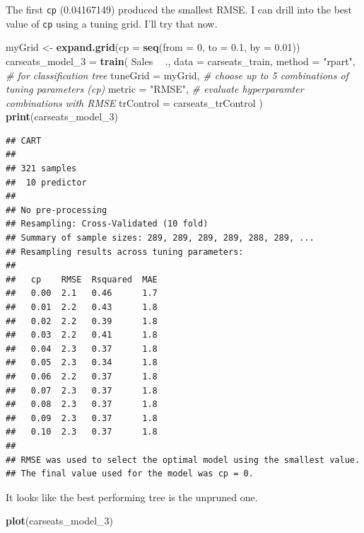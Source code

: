 \documentclass[
]{book}
\newenvironment{Shaded}{\begin{snugshade}}{\end{snugshade}}
\newcommand{\CommentTok}[1]{\textcolor[rgb]{0.56,0.35,0.01}{\textit{#1}}}
\newcommand{\DataTypeTok}[1]{\textcolor[rgb]{0.13,0.29,0.53}{#1}}
\newcommand{\DecValTok}[1]{\textcolor[rgb]{0.00,0.00,0.81}{#1}}
\newcommand{\FloatTok}[1]{\textcolor[rgb]{0.00,0.00,0.81}{#1}}
\newcommand{\KeywordTok}[1]{\textcolor[rgb]{0.13,0.29,0.53}{\textbf{#1}}}
\newcommand{\NormalTok}[1]{#1}
\newcommand{\OperatorTok}[1]{\textcolor[rgb]{0.81,0.36,0.00}{\textbf{#1}}}
\newcommand{\StringTok}[1]{\textcolor[rgb]{0.31,0.60,0.02}{#1}}
\begin{document}
The first \texttt{cp} (0.04167149) produced the smallest RMSE. I can drill into the best value of \texttt{cp} using a tuning grid. I'll try that now.

\begin{Shaded}
\begin{Highlighting}[]
\NormalTok{myGrid <-}\StringTok{  }\KeywordTok{expand.grid}\NormalTok{(}\DataTypeTok{cp =} \KeywordTok{seq}\NormalTok{(}\DataTypeTok{from =} \DecValTok{0}\NormalTok{, }\DataTypeTok{to =} \FloatTok{0.1}\NormalTok{, }\DataTypeTok{by =} \FloatTok{0.01}\NormalTok{))}
\NormalTok{carseats_model_}\DecValTok{3}\NormalTok{ =}\StringTok{ }\KeywordTok{train}\NormalTok{(}
\NormalTok{   Sales }\OperatorTok{~}\StringTok{ }\NormalTok{., }
   \DataTypeTok{data =}\NormalTok{ carseats_train, }
   \DataTypeTok{method =} \StringTok{"rpart"}\NormalTok{,  }\CommentTok{# for classification tree}
   \DataTypeTok{tuneGrid =}\NormalTok{ myGrid,  }\CommentTok{# choose up to 5 combinations of tuning parameters (cp)}
   \DataTypeTok{metric =} \StringTok{"RMSE"}\NormalTok{,  }\CommentTok{# evaluate hyperparamter combinations with RMSE}
   \DataTypeTok{trControl =}\NormalTok{ carseats_trControl}
\NormalTok{)}
\KeywordTok{print}\NormalTok{(carseats_model_}\DecValTok{3}\NormalTok{)}
\end{Highlighting}
\end{Shaded}

\begin{verbatim}
## CART 
## 
## 321 samples
##  10 predictor
## 
## No pre-processing
## Resampling: Cross-Validated (10 fold) 
## Summary of sample sizes: 289, 289, 289, 289, 288, 289, ... 
## Resampling results across tuning parameters:
## 
##   cp    RMSE  Rsquared  MAE
##   0.00  2.1   0.46      1.7
##   0.01  2.2   0.43      1.8
##   0.02  2.2   0.39      1.8
##   0.03  2.2   0.41      1.8
##   0.04  2.3   0.37      1.8
##   0.05  2.3   0.34      1.8
##   0.06  2.2   0.37      1.8
##   0.07  2.3   0.37      1.8
##   0.08  2.3   0.37      1.8
##   0.09  2.3   0.37      1.8
##   0.10  2.3   0.37      1.8
## 
## RMSE was used to select the optimal model using the smallest value.
## The final value used for the model was cp = 0.
\end{verbatim}

It looks like the best performing tree is the unpruned one.

\begin{Shaded}
\begin{Highlighting}[]
\KeywordTok{plot}\NormalTok{(carseats_model_}\DecValTok{3}\NormalTok{)}
\end{Highlighting}
\end{Shaded}
\end{document}

